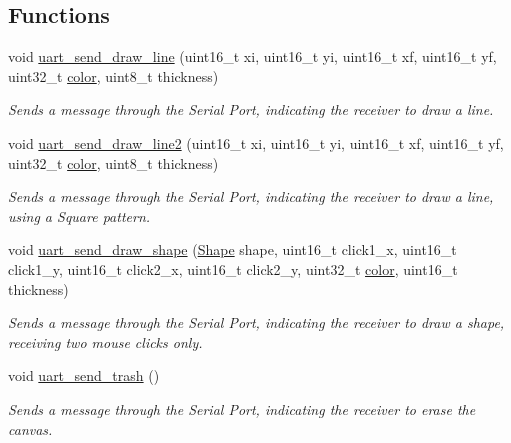 \subsection*{Functions}
\begin{DoxyCompactItemize}
\item 
void \mbox{\hyperlink{group__uart__wordgame_ga1e068477d3dabfe39330ad4efb181c05}{uart\+\_\+send\+\_\+draw\+\_\+line}} (uint16\+\_\+t xi, uint16\+\_\+t yi, uint16\+\_\+t xf, uint16\+\_\+t yf, uint32\+\_\+t \mbox{\hyperlink{structcolor}{color}}, uint8\+\_\+t thickness)
\begin{DoxyCompactList}\small\item\em Sends a message through the Serial Port, indicating the receiver to draw a line. \end{DoxyCompactList}\item 
void \mbox{\hyperlink{group__uart__wordgame_ga9c79cd583507ad0387dafa9603428206}{uart\+\_\+send\+\_\+draw\+\_\+line2}} (uint16\+\_\+t xi, uint16\+\_\+t yi, uint16\+\_\+t xf, uint16\+\_\+t yf, uint32\+\_\+t \mbox{\hyperlink{structcolor}{color}}, uint8\+\_\+t thickness)
\begin{DoxyCompactList}\small\item\em Sends a message through the Serial Port, indicating the receiver to draw a line, using a Square pattern. \end{DoxyCompactList}\item 
void \mbox{\hyperlink{group__uart__wordgame_gaa1ece807e818a133490fa5f201314981}{uart\+\_\+send\+\_\+draw\+\_\+shape}} (\mbox{\hyperlink{group__canvas_ga55b506070847a13554f8b879c1bfb37c}{Shape}} shape, uint16\+\_\+t click1\+\_\+x, uint16\+\_\+t click1\+\_\+y, uint16\+\_\+t click2\+\_\+x, uint16\+\_\+t click2\+\_\+y, uint32\+\_\+t \mbox{\hyperlink{structcolor}{color}}, uint16\+\_\+t thickness)
\begin{DoxyCompactList}\small\item\em Sends a message through the Serial Port, indicating the receiver to draw a shape, receiving two mouse clicks only. \end{DoxyCompactList}\item 
void \mbox{\hyperlink{group__uart__wordgame_ga8fbae13c273fbb60f7e2935a8092f782}{uart\+\_\+send\+\_\+trash}} ()
\begin{DoxyCompactList}\small\item\em Sends a message through the Serial Port, indicating the receiver to erase the canvas. \end{DoxyCompactList}\item 

\end{DoxyCompactItemize}
